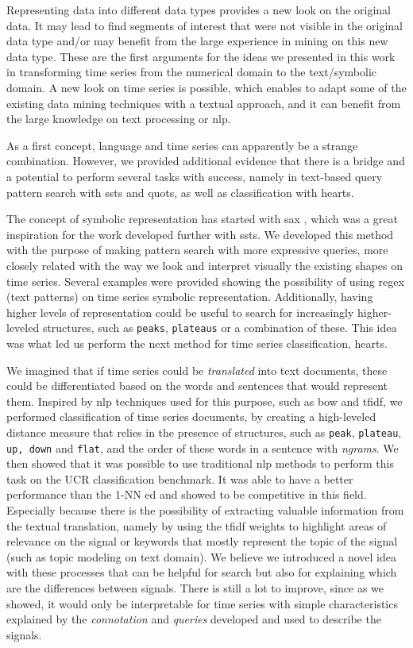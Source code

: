 Representing data into different data types provides a new look on the original data. It may lead to find segments of interest that were not visible in the original data type and/or may benefit from the large experience in mining on this new data type. These are the first arguments for the ideas we presented in this work in transforming time series from the numerical domain to the text/symbolic domain. A new look on time series is possible, which enables to adapt some of the existing data mining techniques with a textual approach, and it can benefit from the large knowledge on text processing or \gls{nlp}.
\par
As a first concept, language and time series can apparently be a strange combination. However, we provided additional evidence that there is a bridge and a potential to perform several tasks with success, namely in text-based query pattern search with \gls{ssts} and \gls{quots}, as well as classification with \gls{hearts}. 
\par
The concept of symbolic representation has started with \gls{sax} \cite{sax}, which was a great inspiration for the work developed further with \gls{ssts}. We developed this method with the purpose of making pattern search with more expressive queries, more closely related with the way we look and interpret visually the existing shapes on time series. Several examples were provided showing the possibility of using \gls{regex} (text patterns) on time series symbolic representation. Additionally, having higher levels of representation could be useful to search for increasingly higher-leveled structures, such as \texttt{peaks}, \texttt{plateaus} or a combination of these. This idea was what led us perform the next method for time series classification, \gls{hearts}. 
\par
We imagined that if time series could be \textit{translated} into text documents, these could be differentiated based on the words and sentences that would represent them. Inspired by \gls{nlp} techniques used for this purpose, such as \gls{bow} and \gls{tfidf}, we performed classification of time series documents, by creating a high-leveled distance measure that relies in the presence of structures, such as \texttt{peak}, \texttt{plateau}, \texttt{up, down} and \texttt{flat}, and the order of these words in a sentence with \textit{ngrams}. We then showed that it was possible to use traditional \gls{nlp} methods to perform this task on the UCR classification benchmark. It was able to have a better performance than the 1-NN \gls{ed} and showed to be competitive in this field. Especially because there is the possibility of extracting valuable information from the textual translation, namely by using the \gls{tfidf} weights to highlight areas of relevance on the signal or keywords that mostly represent the topic of the signal (such as topic modeling on text domain). We believe we introduced a novel idea with these processes that can be helpful for search but also for explaining which are the differences between signals. There is still a lot to improve, since as we showed, it would only be interpretable for time series with simple characteristics explained by the \textit{connotation} and \textit{queries} developed and used to describe the signals.
